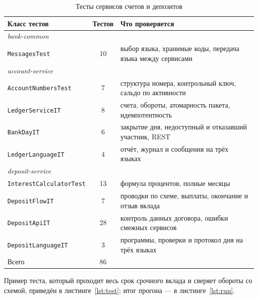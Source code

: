 \documentclass[14pt,a4paper]{extarticle}
\begin{document}
\begin{table}[H]
\caption{Тесты сервисов счетов и депозитов}
\label{tab:tests}
\centering
\small
\begin{tabularx}{\textwidth}{lcX}
\toprule
Класс тестов & Тестов & Что проверяется \\
\midrule
\multicolumn{3}{l}{\textit{bank-common}} \\
\texttt{MessagesTest} & 10 & выбор языка, хранимые коды, передача языка между сервисами \\
\midrule
\multicolumn{3}{l}{\textit{account-service}} \\
\texttt{AccountNumbersTest} & 7 & структура номера, контрольный ключ, сальдо по активности \\
\texttt{LedgerServiceIT} & 8 & счета, обороты, атомарность пакета, идемпотентность \\
\texttt{BankDayIT} & 6 & закрытие дня, недоступный и отказавший участник, REST \\
\texttt{LedgerLanguageIT} & 4 & отчёт, журнал и сообщения на трёх языках \\
\midrule
\multicolumn{3}{l}{\textit{deposit-service}} \\
\texttt{InterestCalculatorTest} & 13 & формула процентов, полные месяцы \\
\texttt{DepositFlowIT} & 7 & проводки по схеме, выплаты, окончание и отзыв вклада \\
\texttt{DepositApiIT} & 28 & контроль данных договора, ошибки смежных сервисов \\
\texttt{DepositLanguageIT} & 3 & программы, проверки и протокол дня на трёх языках \\
\midrule
Всего & 86 & \\
\bottomrule
\end{tabularx}
\end{table}

Пример теста, который проходит весь срок срочного вклада и сверяет обороты со схемой,
приведён в листинге~\ref{lst:test}; итог прогона --- в листинге~\ref{lst:run}.
\end{document}
